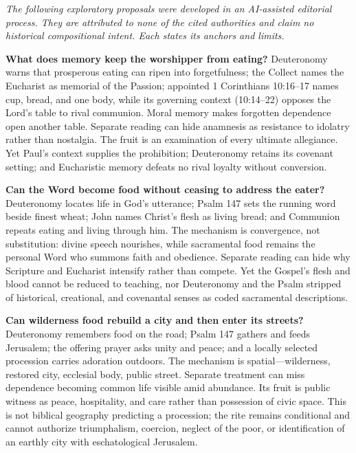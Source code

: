 \begin{deepstudy}
\noindent\emph{The following exploratory proposals were developed in an AI-assisted editorial process. They are attributed to none of the cited authorities and claim no historical compositional intent. Each states its anchors and limits.}

\noindent\textbf{What does memory keep the worshipper from eating?\enspace{}}
Deuteronomy warns that prosperous eating can ripen into forgetfulness; the Collect names the Eucharist as memorial of the Passion; appointed 1 Corinthians 10:16--17 names cup, bread, and one body, while its governing context (10:14--22) opposes the Lord's table to rival communion. Moral memory makes forgotten dependence open another table. Separate reading can hide anamnesis as resistance to idolatry rather than nostalgia. The fruit is an examination of every ultimate allegiance. Yet Paul's context supplies the prohibition; Deuteronomy retains its covenant setting; and Eucharistic memory defeats no rival loyalty without conversion.

\noindent\textbf{Can the Word become food without ceasing to address the eater?\enspace{}}
Deuteronomy locates life in God's utterance; Psalm 147 sets the running word beside finest wheat; John names Christ's flesh as living bread; and Communion repeats eating and living through him. The mechanism is convergence, not substitution: divine speech nourishes, while sacramental food remains the personal Word who summons faith and obedience. Separate reading can hide why Scripture and Eucharist intensify rather than compete. Yet the Gospel's flesh and blood cannot be reduced to teaching, nor Deuteronomy and the Psalm stripped of historical, creational, and covenantal senses as coded sacramental descriptions.

\noindent\textbf{Can wilderness food rebuild a city and then enter its streets?\enspace{}}
Deuteronomy remembers food on the road; Psalm 147 gathers and feeds Jerusalem; the offering prayer asks unity and peace; and a locally selected procession carries adoration outdoors. The mechanism is spatial---wilderness, restored city, ecclesial body, public street. Separate treatment can miss dependence becoming common life visible amid abundance. Its fruit is public witness as peace, hospitality, and care rather than possession of civic space. This is not biblical geography predicting a procession; the rite remains conditional and cannot authorize triumphalism, coercion, neglect of the poor, or identification of an earthly city with eschatological Jerusalem.


\end{deepstudy}
